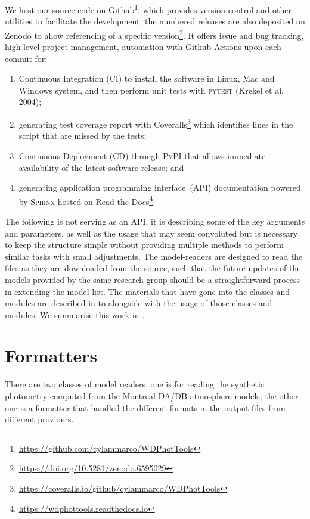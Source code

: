 \documentclass[fleqn,usenatbib]{rasti}
\begin{document}
We host our source code on Github\footnote{\url{https://github.com/cylammarco/WDPhotTools}},
which provides version control and other utilities to facilitate the
development; the numbered releases are also deposited on Zenodo to allow
referencing of a specific version\footnote{\url{https://doi.org/10.5281/zenodo.6595029}}.
It offers issue and bug tracking, high-level project management,
automation with Github Actions upon each commit for:

\begin{enumerate}
    \item Continuous Integration (CI) to install the software in Linux, Mac
    and Windows system, and then perform unit tests with \textsc{pytest}
    (Krekel et al. 2004);
    \item generating test coverage report with Coveralls\footnote{\url{
    https://coveralls.io/github/cylammarco/WDPhotTools}}
    which identifies
    lines in the script that are missed by the tests;
    \item Continuous Deployment (CD) through \textsc{PyPI} that allows
    immediate availability of the latest software release; and
    \item generating application programming interface~(API) documentation
    powered by \textsc{Sphinx} hosted on
    Read the Docs\footnote{\url{https://wdphottools.readthedocs.io}}.
\end{enumerate}

The following is not serving as an API, it is describing some of the key
arguments and parameters, as well as the usage that may seem convoluted but
is necessary to keep the structure simple without providing
multiple methods to perform similar tasks with small adjustments. The
model-readers are designed to read the files as they are downloaded from the
source, such that the future updates of the models provided by the same research
group should be a straightforward process in extending the model list.
The materials that have gone into the classes and modules are
described in  to  alongside with the usage of those
classes and modules. We summarise this work in .

\section{Formatters}
There are two classes of model readers, one is for reading the synthetic
photometry computed from the Montreal DA/DB atmosphere models; the other one is
a formatter that handled the different formats in the output files from
different providers.
\end{document}

